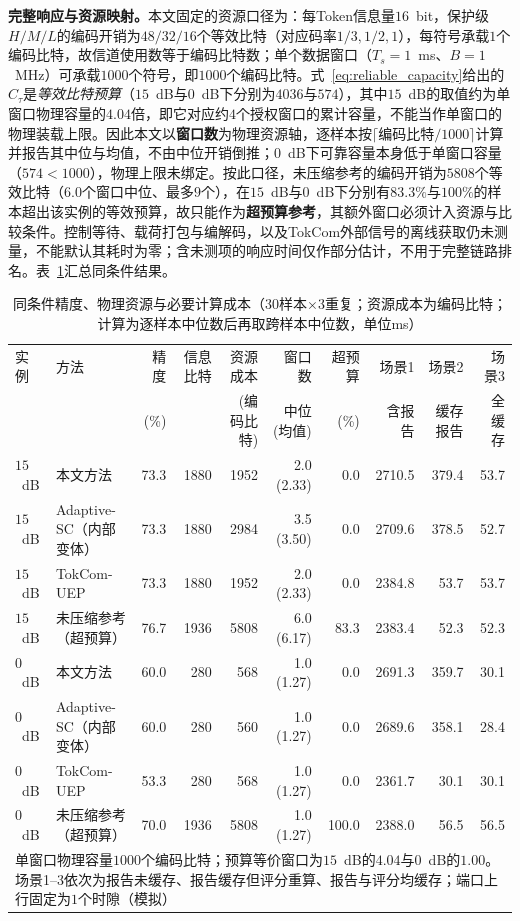\documentclass[journal]{IEEEtran}
\begin{document}
\textbf{完整响应与资源映射。}本文固定的资源口径为：每Token信息量$16$~bit，保护级$H/M/L$的编码开销为$48/32/16$个等效比特（对应码率$1/3,1/2,1$），每符号承载$1$个编码比特，故信道使用数等于编码比特数；单个数据窗口（$T_s=1$~ms、$B=1$~MHz）可承载$1000$个符号，即$1000$个编码比特。式~\eqref{eq:reliable_capacity}给出的$C_\tau$是\emph{等效比特预算}（$15$~dB与$0$~dB下分别为$4036$与$574$），其中$15$~dB的取值约为单窗口物理容量的$4.04$倍，即它对应约$4$个授权窗口的累计容量，不能当作单窗口的物理装载上限。因此本文以\textbf{窗口数}为物理资源轴，逐样本按$\lceil$编码比特$/1000\rceil$计算并报告其中位与均值，不由中位开销倒推；$0$~dB下可靠容量本身低于单窗口容量（$574<1000$），物理上限未绑定。按此口径，未压缩参考的编码开销为$5808$个等效比特（$6.0$个窗口中位、最多$9$个），在$15$~dB与$0$~dB下分别有$83.3\%$与$100\%$的样本超出该实例的等效预算，故只能作为\textbf{超预算参考}，其额外窗口必须计入资源与比较条件。控制等待、载荷打包与编解码，以及TokCom外部信号的离线获取仍未测量，不能默认其耗时为零；含未测项的响应时间仅作部分估计，不用于完整链路排名。表~\ref{tab:latency_baselines}汇总同条件结果。

\begin{table}[t]
\centering
\caption{同条件精度、物理资源与必要计算成本（$30$样本$\times3$重复；资源成本为编码比特；计算为逐样本中位数后再取跨样本中位数，单位ms）}
\label{tab:latency_baselines}
\renewcommand{\arraystretch}{1.05}
\small
\setlength{\tabcolsep}{4pt}
\begin{tabular}{llrrrrrrrr}
\hline
实例 & 方法 & 精度 & 信息比特 & 资源成本 & 窗口数 & 超预算 & 场景1 & 场景2 & 场景3\\
 & & (\%) & & (编码比特) & 中位(均值) & (\%) & 含报告 & 缓存报告 & 全缓存\\
\hline
$15$~dB & 本文方法 & 73.3 & 1880 & 1952 & 2.0 (2.33) & 0.0 & 2710.5 & 379.4 & 53.7\\
$15$~dB & Adaptive-SC（内部变体） & 73.3 & 1880 & 2984 & 3.5 (3.50) & 0.0 & 2709.6 & 378.5 & 52.7\\
$15$~dB & TokCom-UEP & 73.3 & 1880 & 1952 & 2.0 (2.33) & 0.0 & 2384.8 & 53.7 & 53.7\\
$15$~dB & 未压缩参考（超预算） & 76.7 & 1936 & 5808 & 6.0 (6.17) & 83.3 & 2383.4 & 52.3 & 52.3\\
$0$~dB & 本文方法 & 60.0 & 280 & 568 & 1.0 (1.27) & 0.0 & 2691.3 & 359.7 & 30.1\\
$0$~dB & Adaptive-SC（内部变体） & 60.0 & 280 & 560 & 1.0 (1.27) & 0.0 & 2689.6 & 358.1 & 28.4\\
$0$~dB & TokCom-UEP & 53.3 & 280 & 568 & 1.0 (1.27) & 0.0 & 2361.7 & 30.1 & 30.1\\
$0$~dB & 未压缩参考（超预算） & 70.0 & 1936 & 5808 & 1.0 (1.27) & 100.0 & 2388.0 & 56.5 & 56.5\\
\hline
\multicolumn{10}{p{0.95\textwidth}}{单窗口物理容量$1000$个编码比特；预算等价窗口为$15$~dB的$4.04$与$0$~dB的$1.00$。场景1--3依次为报告未缓存、报告缓存但评分重算、报告与评分均缓存；端口上行固定为$1$个时隙（模拟）}\\
\hline
\end{tabular}
\end{table}
\end{document}
